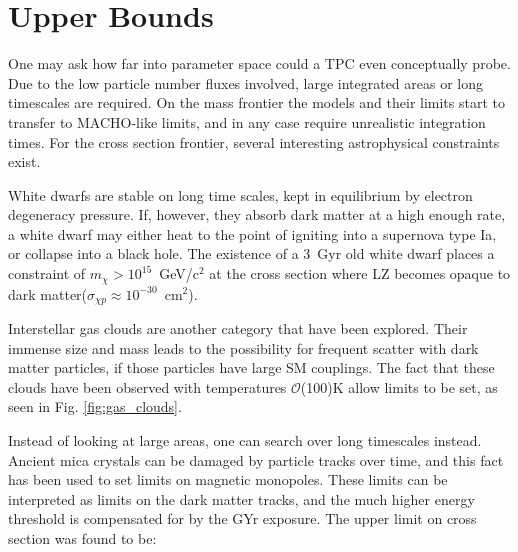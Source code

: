 \section{Upper Bounds}
\label{sec:mimp_upper}

One may ask how far into parameter space could a TPC even conceptually probe.
Due to the low particle number fluxes involved, large integrated areas or long timescales are required.
On the mass frontier the models and their limits start to transfer to MACHO-like limits, and in any case require unrealistic integration times.
For the cross section frontier, several interesting astrophysical constraints exist.

White dwarfs are stable on long time scales, kept in equilibrium by electron degeneracy pressure. If, however, they absorb dark matter at a high enough rate, a white dwarf may either heat to the point of igniting into a supernova type Ia, or collapse into a black hole.
The existence of a 3~Gyr old white dwarf places a constraint of $m_\chi>10^{15}$~GeV/c$^2$ at the cross section where LZ becomes opaque to dark matter($\sigma_{\chi p}\approx 10^{-30}$~cm$^2$)\cite{acevedo_supernovae_2019}.

Interstellar gas clouds are another category that have been explored.
Their immense size and mass leads to the possibility for frequent scatter with dark matter particles, if those particles have large SM couplings.
The fact that these clouds have been observed with temperatures $\mathcal{O}$(100)K allow limits to be set, as seen in Fig. \ref{fig:gas_clouds}\cite{bhoonah_detecting_2020}.

Instead of looking at large areas, one can search over long timescales instead.
Ancient mica crystals can be damaged by particle tracks over time, and this fact has been used to set limits on magnetic monopoles\cite{price_search_1986}.
These limits can be interpreted as limits on the dark matter tracks, and the much higher energy threshold is compensated for by the GYr exposure.
The upper limit on cross section was found to be\cite{bhoonah_detecting_2020}:

